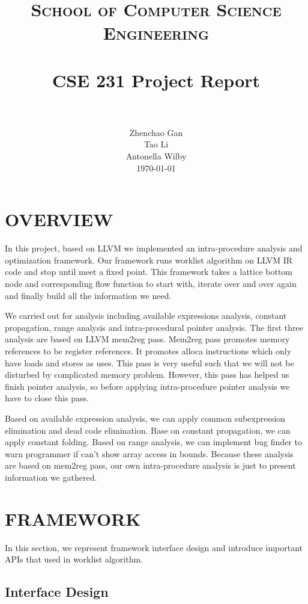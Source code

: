 \documentclass[paper=a4, fontsize=11pt]{scrartcl}
\title{
		\usefont{OT1}{bch}{b}{n}
		\normalfont \normalsize \textsc{School of Computer Science Engineering} \\ [25pt]
		\horrule{0.5pt} \\[0.4cm]
		\huge CSE 231 Project Report\\
		\horrule{2pt} \\[0.5cm]
}
\author{
		\normalfont 								\normalsize
        Zhenchao Gan\\[-3pt]		\normalsize
        Tao Li\\[-3pt]		\normalsize
        Antonella Wilby\\[-3pt]		\normalsize
        \today
}
\date{}
\numberwithin{equation}{section}		%
\numberwithin{figure}{section}			%
\numberwithin{table}{section}				%
\begin{document}
\maketitle
\section{OVERVIEW}

In this project, based on LLVM we implemented an intra-procedure analysis and optimization framework. Our framework runs worklist algorithm on LLVM IR code and stop until meet a fixed point. This framework takes a lattice bottom node and corresponding flow function to start with, iterate over and over again and finally build all the information we need. 

We carried out for analysis including available expressions analysis, constant propagation, range analysis and intra-procedural pointer analysis. The first three analysis are based on LLVM mem2reg pass. Mem2reg pass promotes memory references to be register references. It promotes alloca instructions which only have loads and stores as uses. This pass is very useful such that we will not be disturbed by complicated memory problem. However, this pass has helped us finish pointer analysis, so before applying intra-procedure pointer analysis we have to close this pass.

Based on available expression analysis, we can apply common subexpression elimination and dead code elimination. Base on constant propagation, we can apply constant folding. Based on range analysis, we can implement bug finder to warn programmer if can’t show array access in bounds. Because these analysis are based on mem2reg pass, our own intra-procedure analysis is just to present information we gathered.




\section{FRAMEWORK}

In this section, we represent framework interface design and introduce important APIs that used in worklist algorithm.

\subsection{Interface Design}
\end{document}
